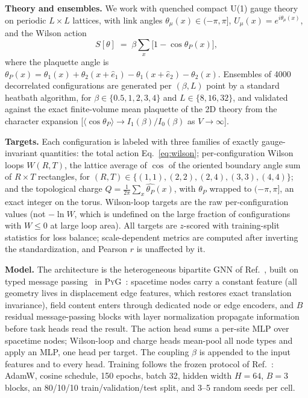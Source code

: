 \documentclass[aps,prd,twocolumn,superscriptaddress,nofootinbib]{revtex4-2}
\newcommand{\thetaP}{\ensuremath{\theta_P}}
\newcommand{\pyg}{\textsc{PyG}}
\begin{document}
\textbf{Theory and ensembles.} We work with quenched compact U(1) gauge
theory on periodic $L \times L$ lattices, with link angles
$\theta_\mu(x) \in (-\pi,\pi]$, $U_\mu(x) = e^{i\theta_\mu(x)}$, and the
Wilson action~\cite{Wilson1974}
\begin{equation}
S[\theta] \;=\; \beta \sum_x \bigl[1 - \cos\thetaP(x)\bigr],
\label{eq:wilson}
\end{equation}
where the plaquette angle is
$\thetaP(x) = \theta_1(x) + \theta_2(x{+}\hat e_1) - \theta_1(x{+}\hat
e_2) - \theta_2(x)$. Ensembles of 4000 decorrelated configurations are
generated per $(\beta, L)$ point by a standard heatbath algorithm, for
$\beta \in \{0.5, 1, 2, 3, 4\}$ and $L \in \{8, 16, 32\}$, and validated
against the exact finite-volume mean plaquette of the 2D theory from the
character expansion
[$\langle \cos\thetaP \rangle \to I_1(\beta)/I_0(\beta)$ as
$V \to \infty$].

\textbf{Targets.} Each configuration is labeled with three families of
exactly gauge-invariant quantities: the total action
Eq.~\eqref{eq:wilson}; per-configuration Wilson loops $W(R,T)$, the
lattice average of $\cos$ of the oriented boundary angle sum of
$R \times T$ rectangles, for
$(R,T) \in \{(1,1),(2,2),(2,4),(3,3),(4,4)\}$; and the topological
charge $Q = \frac{1}{2\pi}\sum_x \widehat{\thetaP}(x)$, with
$\widehat{\thetaP}$ wrapped to $(-\pi,\pi]$, an exact integer on the
torus. Wilson-loop targets are the raw per-configuration values (not
$-\ln W$, which is undefined on the large fraction of configurations
with $W \le 0$ at large loop area). All targets are $z$-scored with
training-split statistics for loss balance; scale-dependent metrics are
computed after inverting the standardization, and Pearson $r$ is
unaffected by it.

\textbf{Model.} The architecture is the heterogeneous bipartite GNN of
Ref.~\cite{Brehm2026}, built on typed message
passing~\cite{Battaglia2018,Schlichtkrull2018,Hu2020} in
\pyg{}~\cite{FeyLenssen2019}: spacetime nodes carry a constant feature
(all geometry lives in displacement edge features, which restores exact
translation invariance), field content enters through dedicated node or
edge encoders, and $B$ residual message-passing blocks with layer
normalization propagate information before task heads read the result.
The action head sums a per-site MLP over spacetime nodes; Wilson-loop
and charge heads mean-pool all node types and apply an MLP, one head per
target. The coupling $\beta$ is appended to the input features and to
every head. Training follows the frozen protocol of
Ref.~\cite{Brehm2026}: AdamW, cosine schedule, 150 epochs, batch 32,
hidden width $H=64$, $B=3$ blocks, an 80/10/10
train/validation/test split, and 3--5 random seeds per cell.
\end{document}
